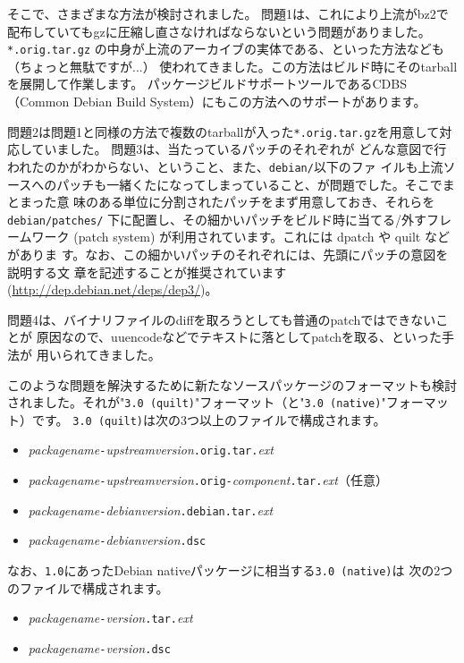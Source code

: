 \documentclass[mingoth,a4paper]{jsarticle}
\begin{document}
そこで、さまざまな方法が検討されました。
問題1は、これにより上流がbz2で配布していてもgzに圧縮し直さなければならないという問題がありました。
\verb|*.orig.tar.gz| の中身が上流のアーカイブの実体である、といった方法なども（ちょっと無駄ですが...）
使われてきました。この方法はビルド時にそのtarballを展開して作業します。
パッケージビルドサポートツールであるCDBS（Common Debian Build System）にもこの方法へのサポートがあります。

問題2は問題1と同様の方法で複数のtarballが入った\verb|*.orig.tar.gz|を用意して対応していました。
問題3は、当たっているパッチのそれぞれが
どんな意図で行われたのかがわからない、ということ、また、\verb|debian/|以下のファ
イルも上流ソースへのパッチも一緒くたになってしまっていること、が問題でした。そこでまとまった意
味のある単位に分割されたパッチをまず用意しておき、それらを
\verb|debian/patches/| 下に配置し、その細かいパッチをビルド時に当てる/外すフレームワーク
(patch system) が利用されています。これには dpatch や quilt などがありま
す。なお、この細かいパッチのそれぞれには、先頭にパッチの意図を説明する文
章を記述することが推奨されています(\url{http://dep.debian.net/deps/dep3/})。

問題4は、バイナリファイルのdiffを取ろうとしても普通のpatchではできないことが
原因なので、uuencodeなどでテキストに落としてpatchを取る、といった手法が
用いられてきました。

このような問題を解決するために新たなソースパッケージのフォーマットも検討
されました。それが"\verb|3.0 (quilt)|"フォーマット（と"\verb|3.0 (native)|"フォーマット）です。
\verb|3.0 (quilt)|は次の3つ以上のファイルで構成されます。
\begin{itemize}
 \item \textit{packagename}\verb|-|\textit{upstreamversion}\verb|.orig.tar.|\textit{ext}
 \item
      \textit{packagename}\verb|-|\textit{upstreamversion}\verb|.orig-|\textit{component}\verb|.tar.|\textit{ext}（任意）
 \item \textit{packagename}\verb|-|\textit{debianversion}\verb|.debian.tar.|\textit{ext}
 \item \textit{packagename}\verb|-|\textit{debianversion}\verb|.dsc|
\end{itemize}

なお、\verb|1.0|にあったDebian nativeパッケージに相当する\verb|3.0 (native)|は
次の2つのファイルで構成されます。
\begin{itemize}
 \item \textit{packagename}\verb|-|\textit{version}\verb|.tar.|\textit{ext}
 \item \textit{packagename}\verb|-|\textit{version}\verb|.dsc|
\end{itemize}
\end{document}
